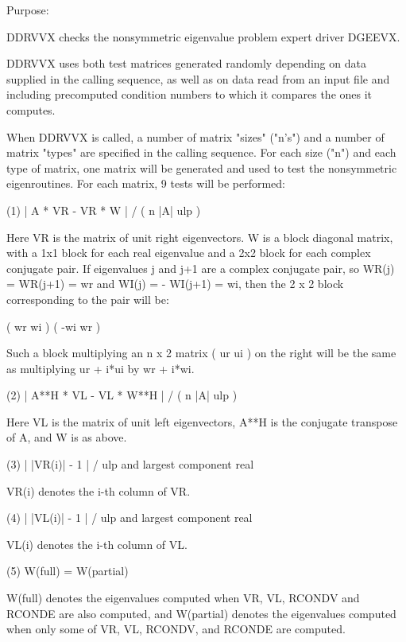 \begin{DoxyParagraph}{Purpose\+: }
\begin{DoxyVerb}    DDRVVX  checks the nonsymmetric eigenvalue problem expert driver
    DGEEVX.

    DDRVVX uses both test matrices generated randomly depending on
    data supplied in the calling sequence, as well as on data
    read from an input file and including precomputed condition
    numbers to which it compares the ones it computes.

    When DDRVVX is called, a number of matrix "sizes" ("n's") and a
    number of matrix "types" are specified in the calling sequence.
    For each size ("n") and each type of matrix, one matrix will be
    generated and used to test the nonsymmetric eigenroutines.  For
    each matrix, 9 tests will be performed:

    (1)     | A * VR - VR * W | / ( n |A| ulp )

      Here VR is the matrix of unit right eigenvectors.
      W is a block diagonal matrix, with a 1x1 block for each
      real eigenvalue and a 2x2 block for each complex conjugate
      pair.  If eigenvalues j and j+1 are a complex conjugate pair,
      so WR(j) = WR(j+1) = wr and WI(j) = - WI(j+1) = wi, then the
      2 x 2 block corresponding to the pair will be:

              (  wr  wi  )
              ( -wi  wr  )

      Such a block multiplying an n x 2 matrix  ( ur ui ) on the
      right will be the same as multiplying  ur + i*ui  by  wr + i*wi.

    (2)     | A**H * VL - VL * W**H | / ( n |A| ulp )

      Here VL is the matrix of unit left eigenvectors, A**H is the
      conjugate transpose of A, and W is as above.

    (3)     | |VR(i)| - 1 | / ulp and largest component real

      VR(i) denotes the i-th column of VR.

    (4)     | |VL(i)| - 1 | / ulp and largest component real

      VL(i) denotes the i-th column of VL.

    (5)     W(full) = W(partial)

      W(full) denotes the eigenvalues computed when VR, VL, RCONDV
      and RCONDE are also computed, and W(partial) denotes the
      eigenvalues computed when only some of VR, VL, RCONDV, and
      RCONDE are computed.


\end{DoxyVerb}
\end{DoxyParagraph}
